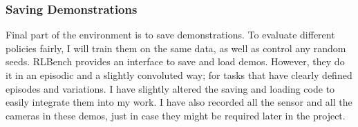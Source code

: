 \subsubsection{Saving Demonstrations}\label{subsec:saving-demos}
Final part of the environment is to save demonstrations. To evaluate different policies fairly, I will train them on the same data, as well as control any random seeds. RLBench provides an interface to save and load demos. However, they do it in an episodic and a slightly convoluted way; for tasks that have clearly defined episodes and variations. I have slightly altered the saving and loading code to easily integrate them into my work. I have also recorded all the sensor and all the cameras in these demos, just in case they might be required later in the project.

